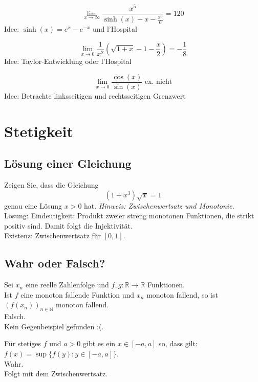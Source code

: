\documentclass[parskip=full]{scrartcl}
\begin{document}
\begin{displaymath}
  \lim_{x \to \infty} \frac{x^5}{\sinh(x) - x - \frac{x^3}{6}} = 120
\end{displaymath}
Idee: $\sinh(x) = e^x - e^{-x}$ und l'Hospital

\begin{displaymath}
  \lim_{x \to 0} \frac{1}{x^2} \left(\sqrt{1 + x} - 1 - \frac{x}{2}\right) = -\frac{1}{8}
\end{displaymath}
Idee: Taylor-Entwicklung oder l'Hospital

\begin{displaymath}
  \lim_{x \to 0} \frac{\cos(x)}{\sin(x)} \text{ ex. nicht}
\end{displaymath}
Idee: Betrachte linksseitigen und rechtsseitigen Grenzwert

\section{Stetigkeit}
\subsection{Lösung einer Gleichung}
Zeigen Sie, dass die Gleichung
\begin{displaymath}
  (1+x^3)\sqrt{x} = 1
\end{displaymath}
genau eine Lösung $x > 0$ hat. \textit{Hinweis: Zwischenwertsatz und Monotonie.}\\
Lösung: Eindeutigkeit: Produkt zweier streng monotonen Funktionen, die strikt positiv sind.
Damit folgt die Injektivität.\\
Existenz: Zwischenwertsatz für $[0,1]$.

\subsection{Wahr oder Falsch?}
Sei $x_n$ eine reelle Zahlenfolge und $f,g : \mathbb{R} \to \mathbb{R}$ Funktionen.\\
Ist $f$ eine monoton fallende Funktion und $x_n$ monoton fallend, so ist $(f(x_n))_{n \in \mathbb{N}}$ monoton fallend.\\
Falsch.\\
Kein Gegenbeispiel gefunden :(.

Für stetiges $f$ und $a > 0$ gibt es ein $x \in [-a,a]$ so, dass gilt: $f(x) = \sup\{f(y) : y \in [-a,a]\}$.\\
Wahr.\\
Folgt mit dem Zwischenwertsatz.
\end{document}
